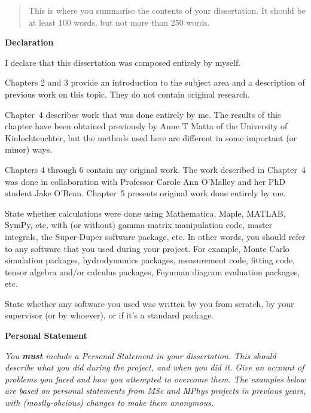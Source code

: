 \documentclass[12pt,a4paper]{report}
\begin{document}
\newpage



\begin{abstract}
This is where you summarise the contents of your dissertation. It should be
at least 100 words, but not more than 250 words.
\end{abstract}


\begin{center}
\textbf{Declaration}
\end{center}

I declare that this dissertation was composed entirely by myself.

Chapters 2 and 3 provide an introduction to the subject area and a
description of previous work on this topic. They do not contain
original research.

Chapter~4 describes work that was done entirely by me. The results of
this chapter have been obtained previously by Anne T Matta of the
University of Kinlochteuchter, but the methods used here are different
in some important (or minor) ways.

Chapters 4 through 6 contain my original work. The work described in
Chapter~4 was done in collaboration with Professor Carole Ann O'Malley
and her PhD student Jake O'Bean. Chapter~5 presents original work done
entirely by me.

\bigskip

State whether calculations were done using Mathematica, Maple, MATLAB,
SymPy, etc, with (or without) gamma-matrix manipulation code, master
integrals, the Super-Duper software package, etc. In other words, you
should refer to any software that you used during your project. For
example, Monte Carlo simulation packages, hydrodynamics packages,
measurement code, fitting code, tensor algebra and/or calculus packages,
Feynman diagram evaluation packages, etc.

State whether any software you used was written by you from scratch,
by your supervisor (or by whoever), or if it's a standard package.

\newpage

\begin{center}
\textbf{Personal Statement}
\end{center}

\emph{You \textbf{\emph{must}} include a Personal Statement in your
  dissertation. This should describe what you did during the project,
  and when you did it. Give an account of problems you faced and how
  you attempted to overcome them. The examples below are based on
  personal statements from MSc and MPhys projects in previous years,
  with (mostly-obvious) changes to make them anonymous. }
\end{document}
